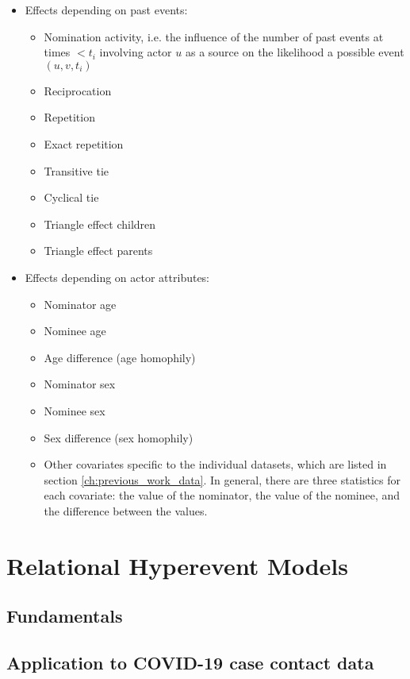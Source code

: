 \begin{itemize}
	\item Effects depending on past events:
	\begin{itemize}
		\item Nomination activity, i.e. the influence of the number of past events at times $<t_i$ involving actor $u$ as a source on the likelihood a possible event $(u,v,t_i)$
		\item Reciprocation
		\item Repetition
		\item Exact repetition
		\item Transitive tie
		\item Cyclical tie
		\item Triangle effect children
		\item Triangle effect parents
	\end{itemize}
	\item Effects depending on actor attributes:
	\begin{itemize}
		\item Nominator age
		\item Nominee age
		\item Age difference (age homophily)
		\item Nominator sex
		\item Nominee sex
		\item Sex difference (sex homophily)
		\item Other covariates specific to the individual datasets, which are listed in section \ref{ch:previous_work_data}. In general, there are three statistics for each covariate: the value of the nominator, the value of the nominee, and the difference between the values.
	\end{itemize}
\end{itemize} 

\section{Relational Hyperevent Models}
\label{sec:rhem}

\subsection{Fundamentals}
\label{sec:rhem_fundamentals}

\subsection{Application to COVID-19 case contact data}
\label{sec:rhem_application}
